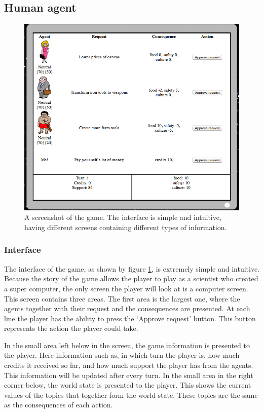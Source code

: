 \documentclass[11pt,a4paper]{article}
\begin{document}
  \subsection{Human agent}
        \begin{figure}[h!]
      \centering
      \includegraphics[scale=0.45]{screenshot}
      \caption{A screenshot of the game. The interface is simple and intuitive, having different screens containing different types of information. }
      \label{fig:scr}
      \end{figure}
      
    \subsubsection{Interface}
      The interface of the game, as shown by figure \ref{fig:scr}, is extremely simple and intuitive. Because the story of the game allows the player to play as a scientist who created a super computer, the only screen the player will look at is a computer screen. This screen contains three areas. The first area is the largest one, where the agents together with their request and the consequences are presented. At each line the player has the ability to press the `Approve request' button. This button represents the action the player could take. 

      In the small area left below in the screen, the game information is presented to the player. Here information such as, in which turn the player is, how much credits it received so far, and how much support the player has from the agents. This information will be updated after every turn. In the small area in the right corner below, the world state is presented to the player. This shows the current values of the topics that together form the world state. These topics are the same as the consequences of each action. 
\end{document}
